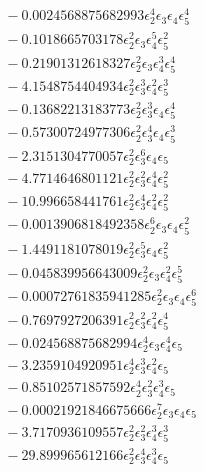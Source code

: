 \documentclass[10pt]{article}
\begin{document}
\begin{align*}
&{}  - 0.0024568875682993 \epsilon_{2}^{4} \epsilon_{3} \epsilon_{4} \epsilon_{5}^{4} \\
&{}  - 0.1018665703178 \epsilon_{2}^{2} \epsilon_{3} \epsilon_{4}^{5} \epsilon_{5}^{2} \\
&{}  - 0.21901312618327 \epsilon_{2}^{2} \epsilon_{3} \epsilon_{4}^{3} \epsilon_{5}^{4} \\
&{}  - 4.1548754404934 \epsilon_{2}^{2} \epsilon_{3}^{3} \epsilon_{4}^{2} \epsilon_{5}^{3} \\
&{}  - 0.13682213183773 \epsilon_{2}^{2} \epsilon_{3}^{3} \epsilon_{4} \epsilon_{5}^{4} \\
&{}  - 0.57300724977306 \epsilon_{2}^{2} \epsilon_{3}^{4} \epsilon_{4} \epsilon_{5}^{3} \\
&{}  - 2.3151304770057 \epsilon_{2}^{2} \epsilon_{3}^{6} \epsilon_{4} \epsilon_{5} \\
&{}  - 4.7714646801121 \epsilon_{2}^{2} \epsilon_{3}^{2} \epsilon_{4}^{4} \epsilon_{5}^{2} \\
&{}  - 10.996658441761 \epsilon_{2}^{2} \epsilon_{3}^{4} \epsilon_{4}^{2} \epsilon_{5}^{2} \\
&{}  - 0.0013906818492358 \epsilon_{2}^{6} \epsilon_{3} \epsilon_{4} \epsilon_{5}^{2} \\
&{}  - 1.4491181078019 \epsilon_{2}^{2} \epsilon_{3}^{5} \epsilon_{4} \epsilon_{5}^{2} \\
&{}  - 0.045839956643009 \epsilon_{2}^{2} \epsilon_{3} \epsilon_{4}^{2} \epsilon_{5}^{5} \\
&{}  - 0.00072761835941285 \epsilon_{2}^{2} \epsilon_{3} \epsilon_{4} \epsilon_{5}^{6} \\
&{}  - 0.7697927206391 \epsilon_{2}^{2} \epsilon_{3}^{2} \epsilon_{4}^{2} \epsilon_{5}^{4} \\
&{}  - 0.024568875682994 \epsilon_{2}^{4} \epsilon_{3} \epsilon_{4}^{4} \epsilon_{5} \\
&{}  - 3.2359104920951 \epsilon_{2}^{4} \epsilon_{3}^{3} \epsilon_{4}^{2} \epsilon_{5} \\
&{}  - 0.85102571857592 \epsilon_{2}^{4} \epsilon_{3}^{2} \epsilon_{4}^{3} \epsilon_{5} \\
&{}  - 0.00021921846675666 \epsilon_{2}^{7} \epsilon_{3} \epsilon_{4} \epsilon_{5} \\
&{}  - 3.7170936109557 \epsilon_{2}^{2} \epsilon_{3}^{2} \epsilon_{4}^{3} \epsilon_{5}^{3} \\
&{}  - 29.899965612166 \epsilon_{2}^{2} \epsilon_{3}^{4} \epsilon_{4}^{3} \epsilon_{5} \\

\end{align*}
\end{document}
